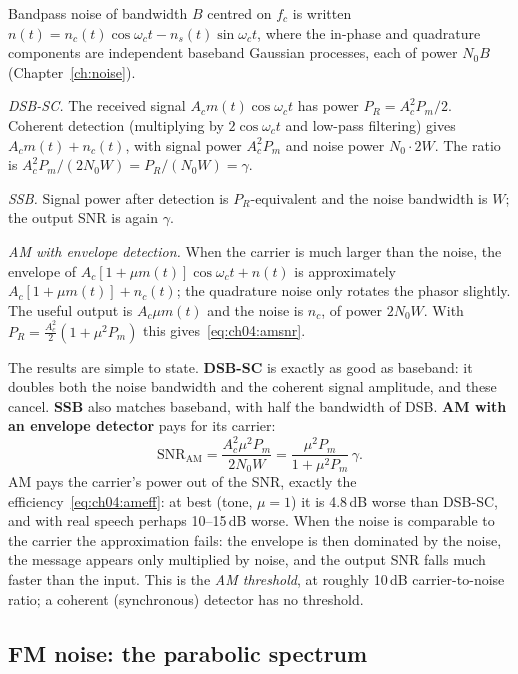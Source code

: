\begin{deeper}
Bandpass noise of bandwidth $B$ centred on $f_c$ is written $n(t)=n_c(t)\cos\omega_ct-n_s(t)\sin\omega_ct$,
where the in-phase and quadrature components are independent baseband Gaussian processes, each of power
$N_0B$ (Chapter~\ref{ch:noise}).

\emph{DSB-SC.} The received signal $A_cm(t)\cos\omega_ct$ has power $P_R=A_c^2P_m/2$. Coherent detection
(multiplying by $2\cos\omega_ct$ and low-pass filtering) gives $A_cm(t)+n_c(t)$, with signal power
$A_c^2P_m$ and noise power $N_0\cdot2W$. The ratio is $A_c^2P_m/(2N_0W)=P_R/(N_0W)=\gamma$.

\emph{SSB.} Signal power after detection is $P_R$-equivalent and the noise bandwidth is $W$; the output SNR
is again $\gamma$.

\emph{AM with envelope detection.} When the carrier is much larger than the noise, the envelope of
$A_c[1+\mu m(t)]\cos\omega_ct+n(t)$ is approximately $A_c[1+\mu m(t)]+n_c(t)$; the quadrature noise only
rotates the phasor slightly. The useful output is $A_c\mu m(t)$ and the noise is $n_c$, of power $2N_0W$.
With $P_R=\frac{A_c^2}{2}(1+\mu^2P_m)$ this gives~\eqref{eq:ch04:amsnr}.
\end{deeper}

The results are simple to state. \textbf{DSB-SC} is exactly as good as baseband: it doubles both the noise
bandwidth and the coherent signal amplitude, and these cancel. \textbf{SSB} also matches baseband, with half
the bandwidth of DSB. \textbf{AM with an envelope detector} pays for its carrier:
\begin{equation}
\text{SNR}_{\text{AM}}=\frac{A_c^2\mu^2P_m}{2N_0W}=\frac{\mu^2P_m}{1+\mu^2P_m}\,\gamma.
\label{eq:ch04:amsnr}
\end{equation}
AM pays the carrier's power out of the SNR, exactly the efficiency~\eqref{eq:ch04:ameff}: at best (tone,
$\mu=1$) it is 4.8\,dB worse than DSB-SC, and with real speech perhaps 10--15\,dB worse. When the noise is
comparable to the carrier the approximation fails: the envelope is then dominated by the noise, the message
appears only multiplied by noise, and the output SNR falls much faster than the input. This is the \emph{AM
threshold}, at roughly 10\,dB carrier-to-noise ratio; a coherent (synchronous) detector has no threshold.

\subsection{FM noise: the parabolic spectrum}
\label{sec:ch04:fmnoise}


